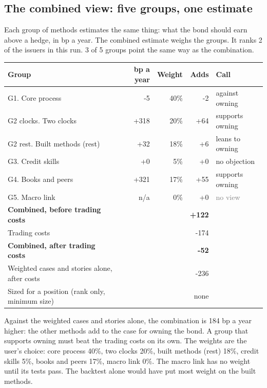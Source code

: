 \documentclass[11pt,a4paper]{article}
\begin{document}
\subsection*{The combined view: five groups, one estimate}
Each group of methods estimates the same thing: what the bond should earn above a hedge, in bp a year. The combined estimate weighs the groups. It ranks 2 of the issuers in this run. 3 of 5 groups point the same way as the combination.
\begin{center}\footnotesize\setlength{\tabcolsep}{3.5pt}\begin{tabular}{@{}lrrrl@{}}\toprule
Group & bp a year & Weight & Adds & Call \\\midrule
G1. Core process & -5 & 40\% & -2 & \textcolor{bad}{against owning} \\
G2 clocks. Two clocks & +318 & 20\% & +64 & \textcolor{good}{supports owning} \\
G2 rest. Built methods (rest) & +32 & 18\% & +6 & \textcolor{amber}{leans to owning} \\
G3. Credit skills & +0 & 5\% & +0 & \textcolor{good}{no objection} \\
G4. Books and peers & +321 & 17\% & +55 & \textcolor{good}{supports owning} \\
G5. Macro link & n/a & 0\% & +0 & \textcolor{gray}{no view} \\
\textbf{Combined, before trading costs} &  &  & \textbf{+122} &  \\
Trading costs &  &  & -174 &  \\
\textbf{Combined, after trading costs} &  &  & \textbf{-52} &  \\
Weighted cases and stories alone, after costs &  &  & -236 &  \\
Sized for a position (rank only, minimum size) &  &  & none &  \\
\bottomrule\end{tabular}\end{center}
Against the weighted cases and stories alone, the combination is 184 bp a year higher: the other methods add to the case for owning the bond. A group that supports owning must beat the trading costs on its own. The weights are the user's choice: core process 40\%, two clocks 20\%, built methods (rest) 18\%, credit skills 5\%, books and peers 17\%, macro link 0\%. The macro link has no weight until its tests pass. The backtest alone would have put most weight on the built methods.
\par\noindent{}
\end{document}

